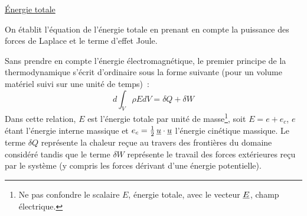 \underline{\'Energie totale}
\nopagebreak

On \'etablit l'\'equation de l'\'energie totale en prenant en compte la
puissance des forces de Laplace et le terme
d'effet Joule.

Sans prendre en compte l'\'energie \'electromagn\'etique,
le premier principe de la thermodynamique s'\'ecrit d'ordinaire sous la
forme suivante (pour un volume mat\'eriel suivi sur une unit\'e de temps)~:
\begin{equation}\label{Elec_Elbase_premier_ppe_eq}
d\int_V \rho E dV=\delta Q+\delta W
\end{equation}
Dans cette relation, $E$ est l'\'energie totale par unit\'e de masse\footnote{Ne pas
confondre le scalaire $E$, \'energie totale, avec le vecteur $\underline{E}$, champ
\'electrique.}, soit $E=e+e_c$, $e$ \'etant l'\'energie interne massique et
$e_c=\frac{1}{2}\,\underline{u}\cdot\underline{u}$ l'\'energie cin\'etique massique. Le terme
$\delta Q$  repr\'esente  la chaleur re\c cue au travers des fronti\`eres du
domaine consid\'er\'e tandis que le terme  $\delta W$ repr\'esente le travail
des forces ext\'erieures re\c cu par le syst\`eme (y compris les forces
d\'erivant d'une \'energie potentielle).


